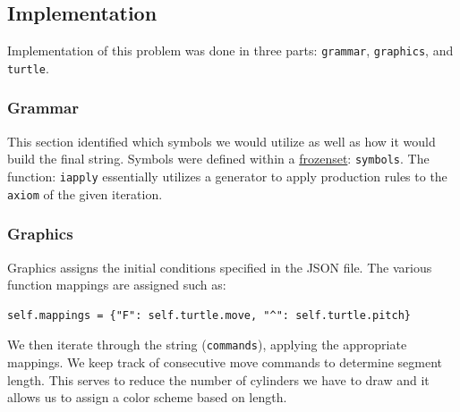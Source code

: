 


\subsection{Implementation}\label{sec:l-sys-implementation}
Implementation of this problem was done in three parts: \texttt{grammar},
\texttt{graphics}, and \texttt{turtle}.

\subsubsection{Grammar}
This section identified which symbols we would utilize as well as how it would
build the final string. Symbols were defined within a
\href{https://docs.python.org/3/library/stdtypes.html#frozenset}{frozenset}:
\texttt{symbols}. The function: \texttt{iapply} essentially
utilizes a generator to apply production rules to the \texttt{axiom} of the
given iteration.

\subsubsection{Graphics}
Graphics assigns the initial conditions specified in the JSON file.
The various function mappings are assigned such as:

\begin{verbatim}
self.mappings = {"F": self.turtle.move, "^": self.turtle.pitch}
\end{verbatim}

We then iterate through the string (\texttt{commands}), applying the
appropriate mappings. We keep track of consecutive move commands to determine
segment length. This serves to reduce the number of cylinders we have to draw
and it allows us to assign a color scheme based on length.


